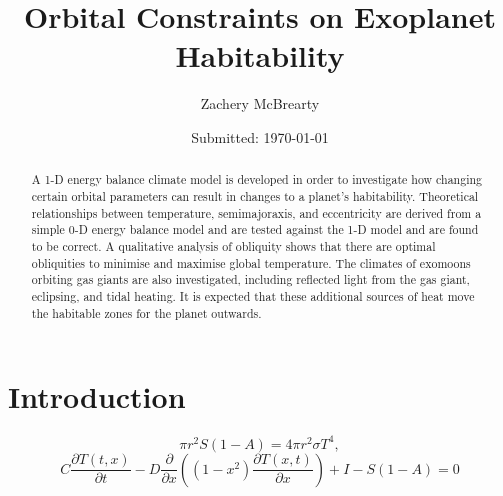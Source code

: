 \documentclass[12pt, onecolumn]{revtex4-2}    %
\newcommand{\partialderiv}[2]{\frac{\partial {#1}}{\partial {#2}}}
\begin{document}
\title{Orbital Constraints on Exoplanet Habitability}
\date{Submitted: \today{}}
\author{Zachery McBrearty}

\begin{abstract}

    A 1-D energy balance climate model is developed in order to investigate how changing certain orbital parameters can result in changes to a planet's habitability.
    Theoretical relationships between temperature, semimajoraxis, and eccentricity are derived from a simple 0-D energy balance model and are tested against the 1-D model and are found to be correct.
    A qualitative analysis of obliquity shows that there are optimal obliquities to minimise and maximise global temperature.
    The climates of exomoons orbiting gas giants are also investigated, including reflected light from the gas giant, eclipsing, and tidal heating.
    It is expected that these additional sources of heat move the habitable zones for the planet outwards.

\end{abstract}


\maketitle

\tableofcontents

\newpage

\section{Introduction} \label{sec:Introduction}


\begin{equation}
    \pi r^2 S(1-A) = 4 \pi r^2 \sigma T^4, \label{eq:0DEBCM}
\end{equation}
\begin{equation}
    C \partialderiv{T(t, x)}{t} - D \partialderiv{}{x} \left((1-x^2)\partialderiv{T(x, t)}{x}\right) + I - S(1-A) = 0
    \label{eq:PDE_in_x}
\end{equation}
\end{document}
